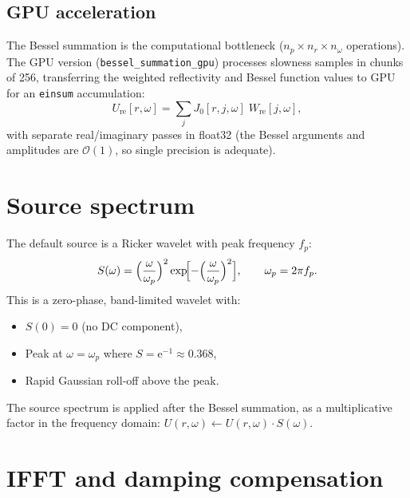 \documentclass[11pt,a4paper]{article}
\newcommand{\order}{\mathcal{O}}
\newcommand{\ee}{\mathrm{e}}
\begin{document}
\subsection{GPU acceleration}

The Bessel summation is the computational bottleneck
($n_p \times n_r \times n_\omega$ operations).  The GPU version
(\texttt{bessel\_summation\_gpu}) processes slowness samples in
chunks of 256, transferring the weighted reflectivity and Bessel
function values to GPU for an \texttt{einsum} accumulation:
\begin{equation}
  U_{\text{re}}[r, \omega] = \sum_j J_0[r, j, \omega]\;W_{\text{re}}[j, \omega],
\end{equation}
with separate real/imaginary passes in float32 (the Bessel arguments
and amplitudes are $\order(1)$, so single precision is adequate).

\section{Source spectrum}
\label{sec:source}

The default source is a Ricker wavelet with peak frequency $f_p$:
\begin{equation}\label{eq:ricker}
  S(\omega) = \Bigl(\frac{\omega}{\omega_p}\Bigr)^2
    \exp\!\Bigl[-\Bigl(\frac{\omega}{\omega_p}\Bigr)^2\Bigr],
    \qquad \omega_p = 2\pi f_p.
\end{equation}
This is a zero-phase, band-limited wavelet with:
\begin{itemize}[nosep]
  \item $S(0) = 0$ (no DC component),
  \item Peak at $\omega = \omega_p$ where $S = \ee^{-1} \approx 0.368$,
  \item Rapid Gaussian roll-off above the peak.
\end{itemize}

The source spectrum is applied after the Bessel summation, as a
multiplicative factor in the frequency domain:
$U(r, \omega) \leftarrow U(r, \omega) \cdot S(\omega)$.

\section{IFFT and damping compensation}
\label{sec:ifft}
\end{document}
